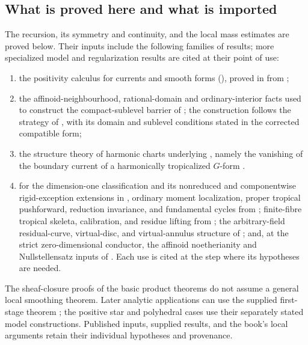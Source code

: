 \subsection{What is proved here and what is imported}
\label{sec:ch16-imported}

The recursion, its symmetry and continuity, and the local mass estimates
are proved below.  Their inputs include the following families of results;
more specialized model and regularization results are cited at their point
of use:
\begin{enumerate}
\item the positivity calculus for currents and smooth forms
 (), proved in
  from \cite[Lemma~5.2.9 and
 Proposition~3.2.4]{CLD25};
\item the affinoid-neighbourhood, rational-domain and ordinary-interior facts
 used to construct the compact-sublevel barrier of
 ; the construction follows the strategy of
 \cite[Proposition~16.9.1]{CLD25}, with its domain and sublevel conditions
 stated in the corrected compatible form;
\item the structure theory of harmonic charts underlying
 , namely the vanishing of the boundary
 current of a harmonically tropicalized $G$-form
 \cite[Theorem~7.8.5 and Corollary~7.8.8]{CLD25}.
\item for the dimension-one classification and its nonreduced and
 componentwise rigid-exception extensions in
 , ordinary moment localization, proper tropical
 pushforward, reduction invariance, and fundamental cycles from
 \cite{CLD25}; finite-fibre tropical skeleta, calibration, and residue
 lifting from \cite{GJR26}; the arbitrary-field residual-curve,
 virtual-disc, and virtual-annulus structure of
 \cite{Ducros24CurveStructure}; and, at the strict zero-dimensional
 conductor, the affinoid noetherianity and Nullstellensatz inputs of
 \cite{Tate71Rigid}.  Each use is cited at the step where its hypotheses are
 needed.
\end{enumerate}
The sheaf-closure proofs of the basic product theorems do not assume a
general local smoothing theorem.  Later analytic applications can use the
supplied first-stage theorem
; the positive star and
polyhedral cases use their separately stated model constructions.  Published
inputs, supplied results, and the book's local arguments retain their
individual hypotheses and provenance.

